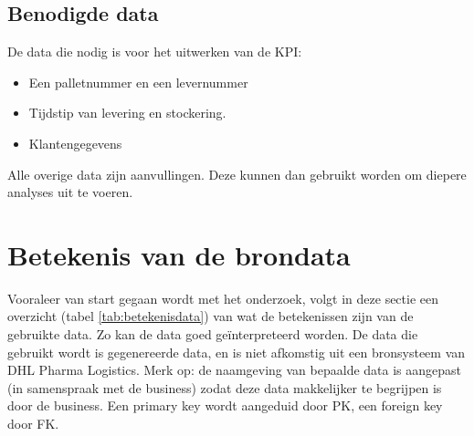 \subsection{Benodigde data}
De data die nodig is voor het uitwerken van de KPI:
\begin{itemize}
	\item Een palletnummer en een levernummer
	\item Tijdstip van levering en stockering.
	\item Klantengegevens
\end{itemize} 

Alle overige data zijn aanvullingen. Deze kunnen dan gebruikt worden om diepere analyses uit te voeren.

\section{Betekenis van de brondata}
\label{sec:betekenisdata}
Vooraleer van start gegaan wordt met het onderzoek, volgt in deze sectie een overzicht (tabel \ref{tab:betekenisdata}) van wat de betekenissen zijn van de gebruikte data. Zo kan de data goed geïnterpreteerd worden. De data die gebruikt wordt is gegenereerde data, en is niet afkomstig uit een bronsysteem van DHL Pharma Logistics. Merk op: de naamgeving van bepaalde data is aangepast (in samenspraak met de business) zodat deze data makkelijker te begrijpen is door de business. Een primary key wordt aangeduid door PK, een foreign key door FK.

